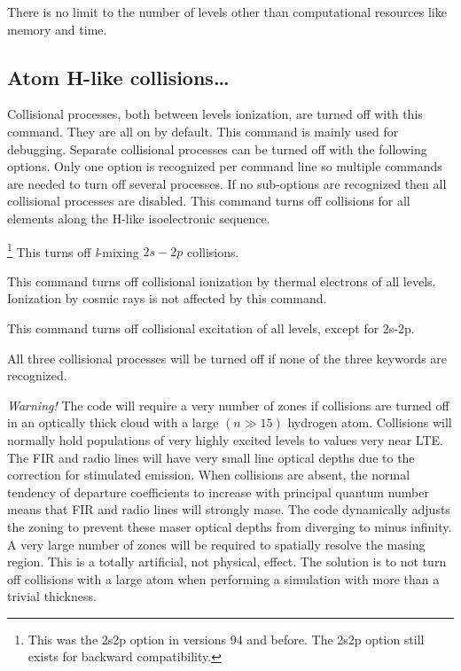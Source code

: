 There is no limit to the number of levels other than computational resources
like memory and time.

\subsection{Atom H-like collisions\dots }

Collisional processes, both between levels ionization, are turned off
with this command.  They are all on by default.  This command is mainly
used for debugging.  Separate collisional processes can be turned off with
the following options.  Only one option is recognized per command line so
multiple commands are needed to turn off several processes.  If no
sub-options are recognized then all collisional processes are disabled.
This command turns off collisions for all elements along the H-like
isoelectronic sequence.

\footnote{This was the 2s2p option in versions 94 and before.  The 2s2p option
still exists for backward compatibility.}
This turns off \emph{l}-mixing $2s-2p$ collisions.

This command turns off collisional
ionization by thermal electrons of all levels.
Ionization by
cosmic rays is not affected by this command.

This command turns off collisional
excitation of all levels, except for 2s-2p.

All three collisional processes will be turned
off if none of the three keywords are recognized.

\emph{Warning!}  The code will require a very number of zones
if collisions
are turned off in an optically thick cloud with a large
$(n \gg 15)$ hydrogen atom.
Collisions will normally hold populations of very highly excited
levels to values very near LTE.
The FIR and radio lines will have very
small line optical depths due to the correction for stimulated emission.
When collisions are absent, the normal tendency of departure coefficients
to increase with principal quantum number means that FIR and radio lines
will strongly mase.
The code dynamically adjusts the zoning to prevent
these maser optical depths from diverging to minus infinity.
A very large
number of zones will be required to spatially resolve the masing region.
This is a totally artificial, not physical, effect.
The solution is to
not turn off collisions with a large atom when performing a
simulation with more than a trivial thickness.

